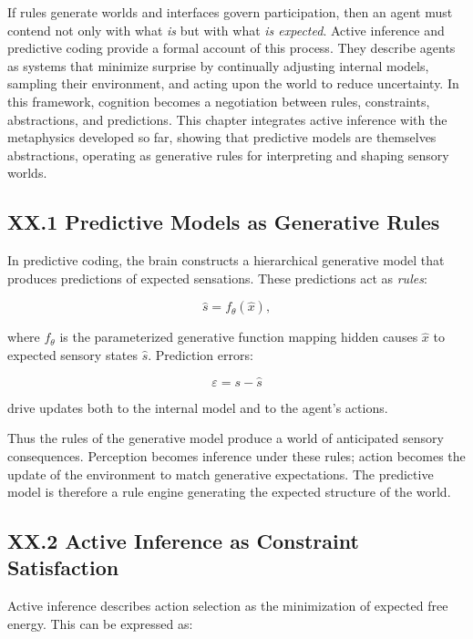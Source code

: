 \documentclass[11pt,letterpaper]{article}
\begin{document}
If rules generate worlds and interfaces govern participation, then an agent must contend not only with what \emph{is} but with what \emph{is expected}. Active inference and predictive coding provide a formal account of this process. They describe agents as systems that minimize surprise by continually adjusting internal models, sampling their environment, and acting upon the world to reduce uncertainty. In this framework, cognition becomes a negotiation between rules, constraints, abstractions, and predictions.  
This chapter integrates active inference with the metaphysics developed so far, showing that predictive models are themselves abstractions, operating as generative rules for interpreting and shaping sensory worlds.

\subsection{XX.1 Predictive Models as Generative Rules}

In predictive coding, the brain constructs a hierarchical generative model that produces predictions of expected sensations. These predictions act as \emph{rules}:

\[
\hat{s} = f_\theta(\hat{x}),
\]

where \(f_\theta\) is the parameterized generative function mapping hidden causes \(\hat{x}\) to expected sensory states \(\hat{s}\).  
Prediction errors:

\[
\varepsilon = s - \hat{s}
\]

drive updates both to the internal model and to the agent’s actions.

Thus the rules of the generative model produce a world of anticipated sensory consequences. Perception becomes inference under these rules; action becomes the update of the environment to match generative expectations. The predictive model is therefore a rule engine generating the expected structure of the world.

\subsection{XX.2 Active Inference as Constraint Satisfaction}

Active inference describes action selection as the minimization of expected free energy. This can be expressed as:
\end{document}
